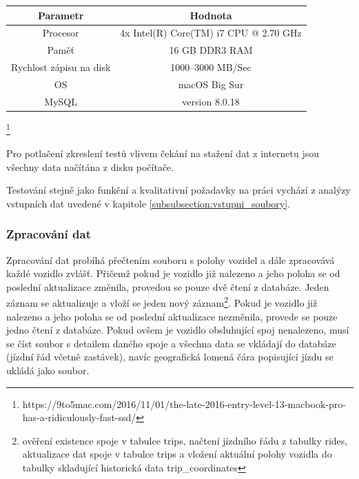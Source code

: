 \begin{center}
   \begin{table}[ht]
\centering
\begin{tabular}{|c|c|}
\hline
Parametr & Hodnota \\ \hline \hline
Procesor & 4x Intel(R) Core(TM) i7 CPU @ 2.70 GHz\\ \hline
Paměť & 16 GB DDR3 RAM  \\  \hline
Rychlost zápisu na disk & 1000--3000 MB/Sec \\ \hline
OS & macOS Big Sur\\ \hline
MySQL & version 8.0.18\\ \hline
\end{tabular}
\label{table:hw}
\end{table}
\end{center}
\footnote{https://9to5mac.com/2016/11/01/the-late-2016-entry-level-13-macbook-pro-has-a-ridiculously-fast-ssd/}


\bigbreak


Pro potlačení zkreslení testů vlivem čekání na stažení dat z internetu jsou všechny data načítána z disku počítače.


\bigbreak


Testování stejně jako funkční a kvalitativní požadavky na práci vychází z analýzy vstupních dat uvedené v kapitole \ref{subsubsection:vstupni_soubory}.


\subsubsection{Zpracování dat}


Zpracování dat probíhá přečtením souboru s polohy vozidel a dále zpracovává každé vozidlo zvlášť. Přičemž pokud je vozidlo již nalezeno a jeho poloha se od poslední aktualizace změnila, provedou se pouze dvě čtení z databáze. Jeden záznam se aktualizuje a vloží se jeden nový záznam\footnote{ověření existence spoje v tabulce trips, načtení jízdního řádu z tabulky rides, aktualizace dat spoje v tabulce trips a vložení aktuální polohy vozidla do tabulky skladující historická data trip\_coordinates}. Pokud je vozidlo již nalezeno a jeho poloha se od poslední aktualizace nezměnila, provede se pouze jedno čtení z databáze. Pokud ovšem je vozidlo obsluhující spoj nenalezeno, musí se číst soubor s detailem daného spoje a všechna data se vkládají do databáze (jízdní řád včetně zastávek), navíc geografická lomená čára popisující jízdu se ukládá jako soubor.



